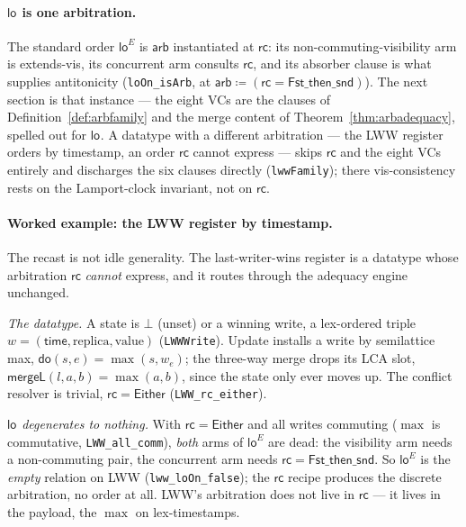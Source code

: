 \documentclass[11pt]{article}
\newcommand{\rcrel}{\mathsf{rc}}                 %
\newcommand{\mergeL}{\mathsf{mergeL}}
\newcommand{\loE}[1]{\mathsf{lo}^{#1}}
\newcommand{\lean}[1]{\texttt{#1}}
\newcommand{\dodo}{\mathsf{do}}
\newcommand{\arb}{\mathsf{arb}}
\begin{document}
\paragraph{\texorpdfstring{$\loE{}$}{lo} is one arbitration.} The standard
order $\loE{E}$ is $\arb$ instantiated at $\rcrel$: its
non-commuting-visibility arm is extends-vis, its concurrent arm consults
$\rcrel$, and its absorber clause is what supplies antitonicity
(\lean{loOn\_isArb}, at
$\arb \coloneqq (\rcrel = \mathsf{Fst\_then\_snd})$). The next section is
that instance --- the eight VCs are the clauses of
Definition~\ref{def:arbfamily} and the merge content of
Theorem~\ref{thm:arbadequacy}, spelled out for $\loE{}$. A datatype with a
different arbitration --- the LWW register orders by timestamp, an order
$\rcrel$ cannot express --- skips $\rcrel$ and the eight VCs entirely and
discharges the six clauses directly (\lean{lwwFamily}); there
vis-consistency rests on the Lamport-clock invariant, not on $\rcrel$.

\paragraph{Worked example: the LWW register by timestamp.} The recast is
not idle generality. The last-writer-wins register is a datatype whose
arbitration $\rcrel$ \emph{cannot} express, and it routes through the
adequacy engine unchanged.

\emph{The datatype.} A state is $\bot$ (unset) or a winning write, a
lex-ordered triple $w = (\mathsf{time}, \text{replica}, \text{value})$
(\lean{LWWWrite}). Update installs a write by semilattice max,
$\dodo(s, e) = \max(s, w_e)$; the three-way merge drops its LCA slot,
$\mergeL(l, a, b) = \max(a, b)$, since the state only ever moves up. The
conflict resolver is trivial, $\rcrel = \mathsf{Either}$
(\lean{LWW\_rc\_either}).

\emph{$\loE{}$ degenerates to nothing.} With $\rcrel = \mathsf{Either}$ and
all writes commuting ($\max$ is commutative, \lean{LWW\_all\_comm}),
\emph{both} arms of $\loE{E}$ are dead: the visibility arm needs a
non-commuting pair, the concurrent arm needs
$\rcrel = \mathsf{Fst\_then\_snd}$. So $\loE{E}$ is the \emph{empty}
relation on LWW (\lean{lww\_loOn\_false}); the $\rcrel$ recipe produces the
discrete arbitration, no order at all. LWW's arbitration does not live in
$\rcrel$ --- it lives in the payload, the $\max$ on lex-timestamps.
\end{document}
